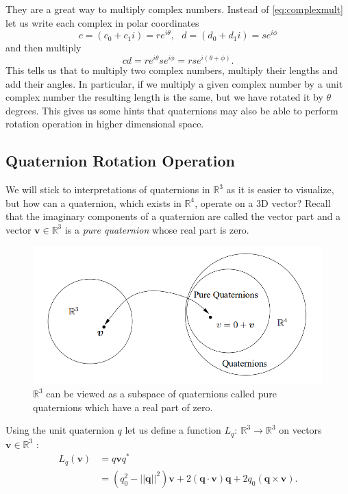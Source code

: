 They are a great way to multiply complex numbers. 
Instead of \eqref{eq:complexmult} let us write each complex in polar coordinates
\begin{equation*}
c = (c_0+c_1i) = re^{i\theta}, ~~~d = (d_0+d_1i) = se^{i\phi}
\end{equation*}
and then multiply
\begin{equation*}
cd = re^{i\theta}se^{i\phi} = rse^{i(\theta+\phi)}.
\end{equation*}
This tells us that to multiply two complex numbers, multiply their lengths and add their angles.
In particular, if we multiply a given complex number by a unit complex number the resulting length is the same, but we have rotated it by $\theta$ degrees. 
This gives us some hints that quaternions may also be able to perform rotation operation in higher dimensional space.



\subsection{Quaternion Rotation Operation}
We will stick to interpretations of quaternions in $\mathbb{R}^3$ as it is easier to visualize, but how can a quaternion, which exists in $\mathbb{R}^4$, operate on a 3D vector?
Recall that the imaginary components of a quaternion are called the vector part and a vector $\textbf{v} \in \mathbb{R}^3$ is a \textit{pure quaternion} whose real part is zero.

\begin{figure}[!h]
	\centering
		\includegraphics[width=1.0\textwidth]{figures/r3.png}
	\caption{$\mathbb{R}^3$ can be viewed as a subspace of quaternions called pure quaternions which have a real part of zero. \cite{jia2008quaternions}}
	\label{f:r3}
\end{figure}

Using the unit quaternion $q$ let us define a function $L_q:~\mathbb{R}^3 \rightarrow \mathbb{R}^3$ on vectors $\textbf{v} \in \mathbb{R}^3$ \cite{hungerford1980algebra}:
\begin{align}
L_q(\textbf{v}) &= q\textbf{v}q^* \nonumber \\
&= (q_0^2 - ||\textbf{q}||^2)\textbf{v} + 2(\textbf{q}\cdot\textbf{v})\textbf{q} + 2q_0(\textbf{q} \times \textbf{v}). 
\label{eq:Lq}
\end{align}

